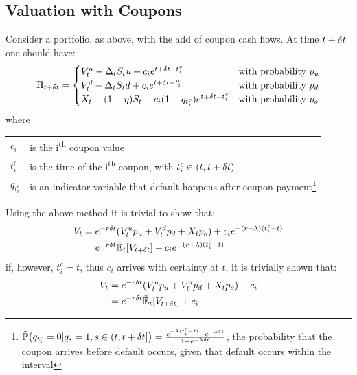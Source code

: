 \documentclass[a4paper,11pt,oneside]{report}
\theoremstyle{plain}
\theoremstyle{definition}
\begin{document}
\subsection{Valuation with Coupons}
Consider a portfolio, as above, with the add of coupon cash flows.  At time $t + \delta t$ one should have:
\begin{equation*}
 \Pi_{t + \delta t} =
 \begin{cases}
  V^{u}_t - \Delta_tS_t u + c_i e^{t + \delta t - t^{c}_i}      & \text{with probability } p_u \\
  V^{d}_t - \Delta_tS_t d + c_i e^{t + \delta t - t^{c}_i}      & \text{with probability } p_d\\
  X_t - (1 - \eta)S_t + c_i (1 - q_{t^{c}_i})e^{t + \delta t - t^{c}_i} & \text{with probability } p_o\\
 \end{cases}
\end{equation*}
where

\begin{savenotes}
\begin{tabular}{ll}
 $c_i$          & is the i\textsuperscript{th} coupon value \\
 $t^{c}_i$      & is the time of the i\textsuperscript{th} coupon, with $t^{c}_i \in (t, t + \delta t)$ \\
 $q_{t^{c}_i}$  & is an indicator variable that default happens after coupon payment\footnote{$\Prob(q_{t^{c}_i} = 0 | q_s = 1, s \in (t, t + \Dt]) = \frac{e^{-\lambda(t^{c}_i - t)} - e^{-\lambda\Dt}}{1 - e^{-\lambda\Dt}}$, the probability that the coupon arrives before default occurs, given that default occurs within the interval}
\end{tabular}
\end{savenotes}

Using the above method it is trivial to show that:
\begin{align}
 V_t    &= e^{-r\Dt}(\Vu\pu + \Vd\pd + \X\po) + c_i e^{-(r + \lambda)(t^{c}_i - t)} \n
        &= e^{-r\Dt}\Et[V_{t + \Dt}] + c_i e^{-(r + \lambda)(t^{c}_i - t)}
\end{align}
if, however, $t^{c}_i = t$, thus $c_i$ arrives with certainty at $t$, it is trivially shown that:
\begin{align}
 V_t    &= e^{-r\Dt}(\Vu\pu + \Vd\pd + \X\po) + c_i \n
        &= e^{-r\Dt}\Et[V_{t + \Dt}] + c_i
\end{align}

\end{document}
